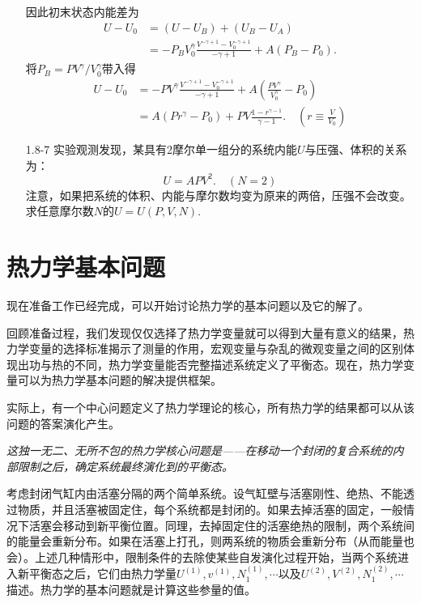 \begin{enumerate}
{			因此初末状态内能差为
			\begin{align*}
				U - U_0 &= (U - U_B) + (U_B - U_A) \\
				&= -P_B V_0^\gamma \frac{ V^{-\gamma + 1} - V_0^{-\gamma + 1} }{-\gamma + 1} + A(P_B - P_0).
			\end{align*}
			将$P_B = PV^\gamma / V_0^\gamma$带入得
			\begin{align*}
				U - U_0 &= -P V^\gamma \frac{V^{-\gamma + 1} - V_0^{-\gamma + 1} }{-\gamma + 1} + A( \frac{PV^\gamma}{V_0^\gamma} - P_0) \\
				&= A(Pr^\gamma - P_0) + PV \frac{1 - r^{\gamma - 1}}{\gamma - 1}. \quad (r \equiv \frac{V}{V_0})
			\end{align*}
		}

		\item[1.8-7]
			实验观测发现，某具有2摩尔单一组分的系统内能$U$与压强、体积的关系为：
			\[ U = APV^2. \quad (N = 2) \]
			注意，如果把系统的体积、内能与摩尔数均变为原来的两倍，压强不会改变。求任意摩尔数$N$的$U = U(P, V, N)$.
\end{enumerate}


\section{热力学基本问题}
\label{sec1.9}
现在准备工作已经完成，可以开始讨论热力学的基本问题以及它的解了。

回顾准备过程，我们发现仅仅选择了热力学变量就可以得到大量有意义的结果，热力学变量的选择标准揭示了测量的作用，宏观变量与杂乱的微观变量之间的区别体现出功与热的不同，热力学变量能否完整描述系统定义了平衡态。现在，热力学变量可以为热力学基本问题的解决提供框架。

实际上，有一个中心问题定义了热力学理论的核心，所有热力学的结果都可以从该问题的答案演化产生。

{\it 这独一无二、无所不包的热力学核心问题是——在移动一个封闭的复合系统的内部限制之后，确定系统最终演化到的平衡态。}

考虑封闭气缸内由活塞分隔的两个简单系统。设气缸壁与活塞刚性、绝热、不能透过物质，并且活塞被固定住，每个系统都是封闭的。如果去掉活塞的固定，一般情况下活塞会移动到新平衡位置。同理，去掉固定住的活塞绝热的限制，两个系统间的能量会重新分布。如果在活塞上打孔，则两系统的物质会重新分布（从而能量也会）。上述几种情形中，限制条件的去除使某些自发演化过程开始，当两个系统进入新平衡态之后，它们由热力学量$U^{(1)}, v^{(1)}, N_1^{(1)}, \cdots$以及$U^{(2)}, V^{(2)}, N_1^{(2)}, \cdots$描述。热力学的基本问题就是计算这些参量的值。

